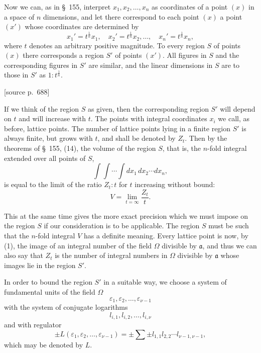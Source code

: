 \documentclass[11pt]{article}
\newcommand{\srcpage}[1]{\par\medskip\noindent\textsf{[source p.~#1]}\par\smallskip}
\begin{document}
Now we can, as in \S~155, interpret $x_1,x_2,\ldots,x_n$ as coordinates of a point $(x)$ in a space of $n$ dimensions, and let there correspond to each point $(x)$ a point $(x')$ whose coordinates are determined by
\begin{equation}
x_1'=t^{\frac1n}x_1,
\quad x_2'=t^{\frac1n}x_2,
\ldots,
\quad x_n'=t^{\frac1n}x_n,
\tag{4}
\end{equation}
where $t$ denotes an arbitrary positive magnitude. To every region $S$ of points $(x)$ there corresponds a region $S'$ of points $(x')$. All figures in $S$ and the corresponding figures in $S'$ are similar, and the linear dimensions in $S$ are to those in $S'$ as $1:t^{\frac1n}$.

\srcpage{688}
If we think of the region $S$ as given, then the corresponding region $S'$ will depend on $t$ and will increase with $t$. The points with integral coordinates $x_i$ we call, as before, lattice points. The number of lattice points lying in a finite region $S'$ is always finite, but grows with $t$, and shall be denoted by $Z_t$. Then by the theorems of \S~155, (14), the volume of the region $S$, that is, the $n$-fold integral extended over all points of $S$,
\[
\int\!\int\cdots\int dx_1\,dx_2\cdots dx_n,
\]
is equal to the limit of the ratio $Z_t:t$ for $t$ increasing without bound:
\begin{equation}
V=\lim_{t=\infty}\frac{Z_t}{t}.
\tag{5}
\end{equation}

This at the same time gives the more exact precision which we must impose on the region $S$ if our consideration is to be applicable. The region $S$ must be such that the $n$-fold integral $V$ has a definite meaning. Every lattice point is now, by (1), the image of an integral number of the field $\Omega$ divisible by $\mathfrak a$, and thus we can also say that $Z_t$ is the number of integral numbers in $\Omega$ divisible by $\mathfrak a$ whose images lie in the region $S'$.

In order to bound the region $S'$ in a suitable way, we choose a system of fundamental units of the field $\Omega$
\[
\varepsilon_1,\varepsilon_2,\ldots,\varepsilon_{\nu-1}
\]
with the system of conjugate logarithms
\[
l_{i,1},l_{i,2},\ldots,l_{i,\nu}
\]
and with regulator
\begin{equation}
\pm L(\varepsilon_1,\varepsilon_2,\ldots,\varepsilon_{\nu-1})=\pm\sum\pm l_{1,1}l_{2,2}\cdots l_{\nu-1,\nu-1},
\tag{6}
\end{equation}
which may be denoted by $L$.
\end{document}
